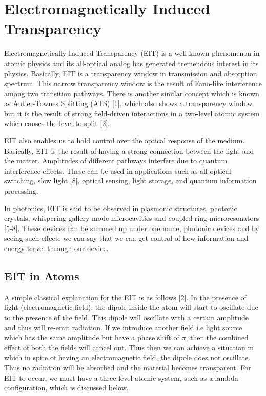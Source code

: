 \section{Electromagnetically Induced Transparency}
Electromagnetically Induced Transparency (EIT) is a well-known phenomenon in atomic physics and its all-optical analog has generated tremendous interest in its physics. Basically, EIT is a transparency window in transmission and absorption spectrum. This narrow transparency window is the result of Fano-like interference among two transition pathways. There is another similar concept which is known as Autler-Townes Splitting (ATS) [1], which also shows a transparency window but it is the result of strong field-driven interactions in a two-level atomic system which causes the level to split [2].

EIT also enables us to hold control over the optical response of the medium. Basically, EIT is the result of having a strong connection between the light and the matter. Amplitudes of different pathways interfere due to quantum interference effects. These can be used in applications such as all-optical switching, slow light [8], optical sensing, light storage, and quantum information processing.

In photonics, EIT is said to be observed in plasmonic structures, photonic crystals, whispering gallery mode microcavities and coupled ring microresonators [5-8]. These devices can be summed up under one name, photonic devices and by seeing such effects we can say that we can get control of how information and energy travel through our device.

\subsection{EIT in Atoms}
A simple classical explanation for the EIT is as follows [2]. In the presence of light (electromagnetic field), the dipole inside the atom will start to oscillate due to the presence of the field. This dipole will oscillate with a certain amplitude and thus will re-emit radiation. If we introduce another field i.e light source which has the same amplitude but have a phase shift of $\pi$, then the combined effect of both the fields will cancel out. Thus then we can achieve a situation in which in spite of having an electromagnetic field, the dipole does not oscillate. Thus no radiation will be absorbed and the material becomes transparent. For EIT to occur, we must have a three-level atomic system, such as a lambda configuration, which is discussed below.

